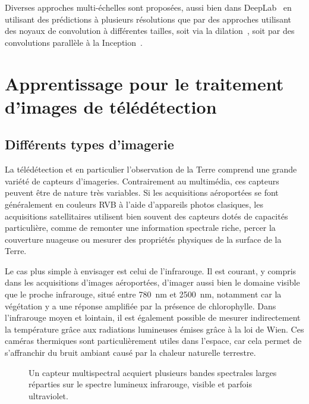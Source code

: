 Diverses approches multi-échelles sont proposées, aussi bien dans DeepLab~\cite{l._c._chen_deeplab_2018} en utilisant des prédictions à plusieurs résolutions que par des approches utilisant des noyaux de convolution à différentes tailles, soit via la dilation~\cite{yu_multi-scale_2015}, soit par des convolutions parallèle à la Inception~\cite{szegedy_going_2015,nekrasov_global_2016,zhao_pyramid_2017}.

\section{Apprentissage pour le traitement d'images de télédétection}

\subsection{Différents types d'imagerie}

La télédétection et en particulier l'observation de la Terre comprend une grande variété de capteurs d'imageries. Contrairement au multimédia, ces capteurs peuvent être de nature très variables. Si les acquisitions aéroportées se font généralement en couleurs \gls{RVB} à l'aide d'appareils photos clasiques, les acquisitions satellitaires utilisent bien souvent des capteurs dotés de capacités particulière, comme de remonter une information spectrale riche, percer la couverture nuageuse ou mesurer des propriétés physiques de la surface de la Terre.

Le cas plus simple à envisager est celui de l'infrarouge. Il est courant, y compris dans les acquisitions d'images aéroportées, d'imager aussi bien le domaine visible que le proche infrarouge, situé entre \SI{780}{\nano\meter} et \SI{2 500}{\nano\meter}, notamment car la végétation y a une réponse amplifiée par la présence de chlorophylle. Dans l'infrarouge moyen et lointain, il est également possible de mesurer indirectement la température grâce aux radiations lumineuses émises grâce à la loi de Wien. Ces caméras thermiques sont particulièrement utiles dans l'espace, car cela permet de s'affranchir du bruit ambiant causé par la chaleur naturelle terrestre.

\begin{figure}
  \resizebox{\textwidth}{!}{
  
  }
  \caption{Un capteur multispectral acquiert plusieurs bandes spectrales larges réparties sur le spectre lumineux infrarouge, visible et parfois ultraviolet.}
  \label{fig:multispectral}
\end{figure}

